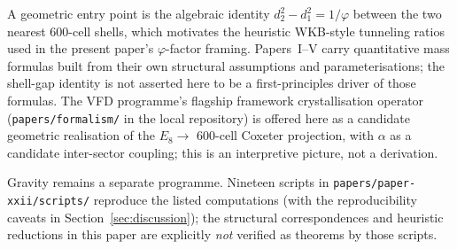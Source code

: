 \documentclass[12pt]{article}
\begin{document}
A geometric entry point is the algebraic identity $d_2^2 - d_1^2 = 1/\varphi$ between the two nearest 600-cell shells, which motivates the heuristic WKB-style tunneling ratios used in the present paper's $\varphi$-factor framing. Papers~I--V carry quantitative mass formulas built from their own structural assumptions and parameterisations; the shell-gap identity is not asserted here to be a first-principles driver of those formulas. The VFD programme's flagship framework crystallisation operator (\texttt{papers/formalism/} in the local repository) is offered here as a candidate geometric realisation of the $E_8 \to$ 600-cell Coxeter projection, with $\alpha$ as a candidate inter-sector coupling; this is an interpretive picture, not a derivation.

Gravity remains a separate programme. Nineteen scripts in \texttt{papers/paper-xxii/scripts/} reproduce the listed computations (with the reproducibility caveats in Section~\ref{sec:discussion}); the structural correspondences and heuristic reductions in this paper are explicitly \emph{not} verified as theorems by those scripts.



\end{document}
